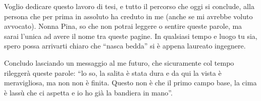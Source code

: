 Voglio dedicare questo lavoro di tesi, e tutto il percorso che oggi si conclude, alla persona che per prima in assoluto ha creduto in me (anche se mi avrebbe voluto avvocato). Nonna Pina, so che non potrai leggere o sentire queste parole, ma sarai l'unica ad avere il nome tra queste pagine. In qualsiasi tempo e luogo tu sia, spero possa arrivarti chiaro che ``nasca bedda'' si è appena laureato ingegnere.

Concludo lasciando un messaggio al me futuro, che sicuramente col tempo rileggerà queste parole: ``lo so, la salita è stata dura e da qui la vista è meravigliosa, ma non non è finita. Questo non è che il primo campo base, la cima è lassù che ci aspetta e io ho già la bandiera in mano''.
